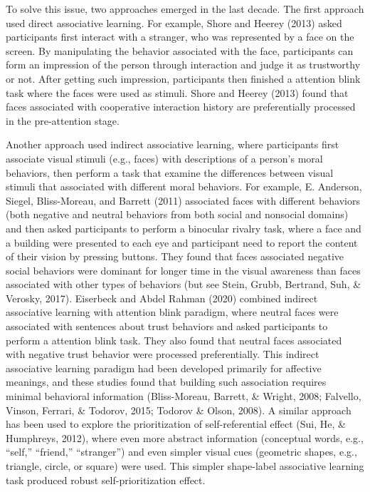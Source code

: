 \documentclass[
  english,
  man]{apa6}
\begin{document}
To solve this issue, two approaches emerged in the last decade. The first approach used direct associative learning. For example, Shore and Heerey (2013) asked participants first interact with a stranger, who was represented by a face on the screen. By manipulating the behavior associated with the face, participants can form an impression of the person through interaction and judge it as trustworthy or not. After getting such impression, participants then finished a attention blink task where the faces were used as stimuli. Shore and Heerey (2013) found that faces associated with cooperative interaction history are preferentially processed in the pre-attention stage.

Another approach used indirect associative learning, where participants first associate visual stimuli (e.g., faces) with descriptions of a person's moral behaviors, then perform a task that examine the differences between visual stimuli that associated with different moral behaviors. For example, E. Anderson, Siegel, Bliss-Moreau, and Barrett (2011) associated faces with different behaviors (both negative and neutral behaviors from both social and nonsocial domains) and then asked participants to perform a binocular rivalry task, where a face and a building were presented to each eye and participant need to report the content of their vision by pressing buttons. They found that faces associated negative social behaviors were dominant for longer time in the visual awareness than faces associated with other types of behaviors (but see Stein, Grubb, Bertrand, Suh, \& Verosky, 2017). Eiserbeck and Abdel Rahman (2020) combined indirect associative learning with attention blink paradigm, where neutral faces were associated with sentences about trust behaviors and asked participants to perform a attention blink task. They also found that neutral faces associated with negative trust behavior were processed preferentially. This indirect associative learning paradigm had been developed primarily for affective meanings, and these studies found that building such association requires minimal behavioral information (Bliss-Moreau, Barrett, \& Wright, 2008; Falvello, Vinson, Ferrari, \& Todorov, 2015; Todorov \& Olson, 2008). A similar approach has been used to explore the prioritization of self-referential effect (Sui, He, \& Humphreys, 2012), where even more abstract information (conceptual words, e.g., ``self,'' ``friend,'' ``stranger'') and even simpler visual cues (geometric shapes, e.g., triangle, circle, or square) were used. This simpler shape-label associative learning task produced robust self-prioritization effect.
\end{document}
